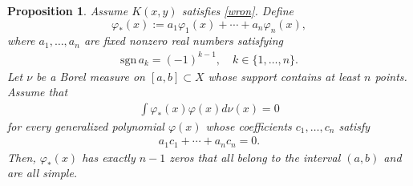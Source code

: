 \documentclass[twoside,a4paper]{amsart}
\newcommand{\sgn}{\mathrm{sgn}}
\newtheorem{proposition}[theorem]{Proposition}
\theoremstyle{remark}
\begin{document}
\begin{proposition}
\label{prop:orthogonality}
Assume \( K(x,y) \) satisfies \eqref{wron}. Define 
\[
\varphi_*(x) := a_1\varphi_1(x) + \cdots + a_n\varphi_n(x),
\]
where  \( a_1,\ldots,a_n\) are fixed nonzero real numbers satisfying
\begin{align}
\label{sign ak}
\sgn\, a_k = (-1)^{k-1}, \quad k\in\{1,\ldots,n\}.
\end{align}
Let \( \nu \) be a Borel measure on \( [a,b]\subset X \) whose support contains at least \( n \) points. 
Assume that 
\begin{align}
\label{ortho}
\int \varphi_*(x)\varphi(x) d\nu(x) =0    
\end{align}
for every generalized polynomial \( \varphi(x) \) whose coefficients \( c_1,\ldots,c_n\) satisfy
\begin{align}
\label{vector ortho}
a_1c_1 + \cdots + a_nc_n =0.
\end{align}
Then, \( \varphi_*(x) \) has exactly \( n-1 \) zeros that all belong to the interval \( (a,b) \) and  are all simple.
\end{proposition}
\end{document}
